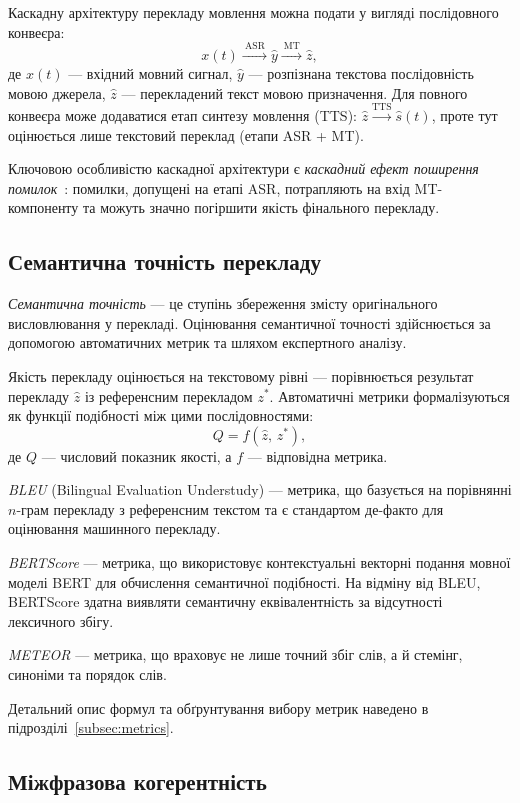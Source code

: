 Каскадну архітектуру перекладу мовлення можна подати у вигляді
послідовного конвеєра:
\[
x(t) \xrightarrow{\ \text{ASR}\ } \hat{y} \xrightarrow{\ \text{MT}\ } \hat{z},
\]
де $x(t)$ --- вхідний мовний сигнал, $\hat{y}$ --- розпізнана текстова
послідовність мовою джерела, $\hat{z}$ --- перекладений текст мовою
призначення. Для повного конвеєра може додаватися етап синтезу мовлення
(TTS): $\hat{z} \xrightarrow{\text{TTS}} \hat{s}(t)$, проте тут
оцінюється лише текстовий переклад (етапи ASR + MT).

Ключовою особливістю каскадної архітектури є \textit{каскадний ефект
поширення помилок}~\cite{error_propagation}: помилки, допущені на
етапі ASR, потрапляють на вхід MT-компоненту та можуть значно
погіршити якість фінального перекладу.

\subsection{Семантична точність перекладу}

\textit{Семантична точність} --- це ступінь збереження змісту оригінального
висловлювання у перекладі. Оцінювання семантичної точності здійснюється за
допомогою автоматичних метрик та шляхом експертного аналізу.

Якість перекладу оцінюється на текстовому рівні --- порівнюється результат
перекладу $\hat{z}$ із референсним перекладом $z^*$. Автоматичні метрики
формалізуються як функції подібності між цими послідовностями:
\[
Q = f(\hat{z},\, z^*),
\]
де $Q$ --- числовий показник якості, а $f$ --- відповідна метрика.

\textit{BLEU} (Bilingual Evaluation Understudy) \cite{papineni_bleu} --- метрика,
що базується на порівнянні $n$-грам перекладу з референсним текстом та є
стандартом де-факто для оцінювання машинного перекладу.

\textit{BERTScore} \cite{bert_score} --- метрика, що використовує контекстуальні
векторні подання мовної моделі BERT для обчислення семантичної подібності.
На відміну від BLEU, BERTScore здатна виявляти семантичну еквівалентність
за відсутності лексичного збігу.

\textit{METEOR} \cite{banerjee_meteor} --- метрика, що враховує не лише точний
збіг слів, а й стемінг, синоніми та порядок слів.

Детальний опис формул та обґрунтування вибору метрик наведено в
підрозділі~\ref{subsec:metrics}.

\subsection{Міжфразова когерентність}

